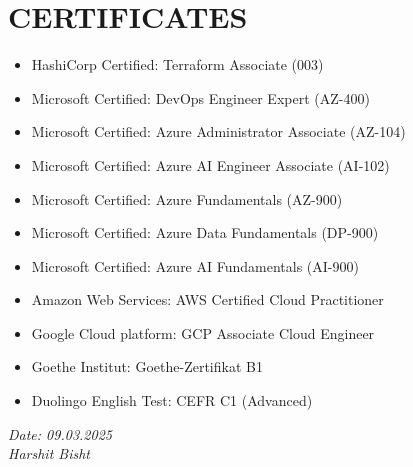 \documentclass[11pt,a4paper]{article}
\begin{document}
\section*{CERTIFICATES}
\begin{itemize}
    \item HashiCorp Certified: Terraform Associate (003)
    \item Microsoft Certified: DevOps Engineer Expert (AZ-400)
    \item Microsoft Certified: Azure Administrator Associate (AZ-104)
    \item Microsoft Certified: Azure AI Engineer Associate (AI-102)
    \item Microsoft Certified: Azure Fundamentals (AZ-900)
    \item Microsoft Certified: Azure Data Fundamentals (DP-900)
    \item Microsoft Certified: Azure AI Fundamentals (AI-900)
    \item Amazon Web Services: AWS Certified Cloud Practitioner
    \item Google Cloud platform: GCP Associate Cloud Engineer
    \item Goethe Institut: Goethe-Zertifikat B1
    \item Duolingo English Test: CEFR C1 (Advanced)
\end{itemize}


\vfill %
\noindent %
\begin{flushright} %
    \textit{Date: 09.03.2025}\\ %
    \textit{Harshit Bisht} %
\end{flushright}
\end{document}
